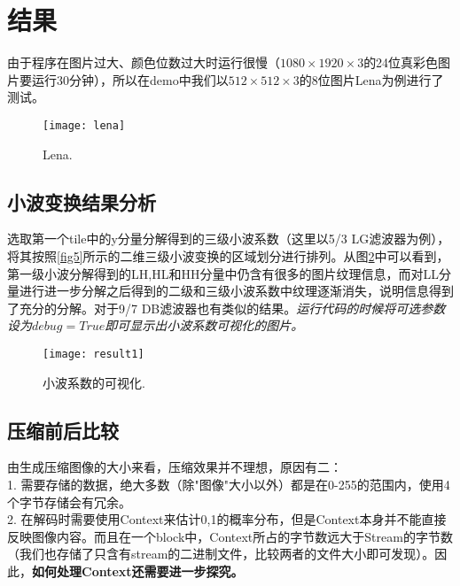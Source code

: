 \section{结果}
由于程序在图片过大、颜色位数过大时运行很慢（$1080\times 1920\times 3$的24位真彩色图片要运行30分钟），所以在demo中我们以$512\times 512\times 3$的8位图片Lena为例进行了测试。
\begin{figure}[H]
	\centering
	\texttt{[image: lena]}
	\caption{Lena.}
	\label{lena}
\end{figure}

\subsection{小波变换结果分析}
选取第一个tile中的y分量分解得到的三级小波系数（这里以5/3 LG滤波器为例），将其按照\ref{fig5}所示的二维三级小波变换的区域划分进行排列。从图\ref{result1}中可以看到，第一级小波分解得到的LH,HL和HH分量中仍含有很多的图片纹理信息，而对LL分量进行进一步分解之后得到的二级和三级小波系数中纹理逐渐消失，说明信息得到了充分的分解。对于9/7 DB滤波器也有类似的结果。\textit{运行代码的时候将可选参数设为$debug=True$即可显示出小波系数可视化的图片。}
\begin{figure}[H]
	\centering
	\texttt{[image: result1]}
	\caption{小波系数的可视化.}
	\label{result1}
\end{figure}

\subsection{压缩前后比较}
由生成压缩图像的大小来看，压缩效果并不理想，原因有二：\\
1. 需要存储的数据，绝大多数（除"图像"大小以外）都是在0-255的范围内，使用4个字节存储会有冗余。\\
2. 在解码时需要使用Context来估计0,1的概率分布，但是Context本身并不能直接反映图像内容。而且在一个block中，Context所占的字节数远大于Stream的字节数（我们也存储了只含有stream的二进制文件，比较两者的文件大小即可发现）。因此，\textbf{如何处理Context还需要进一步探究。}